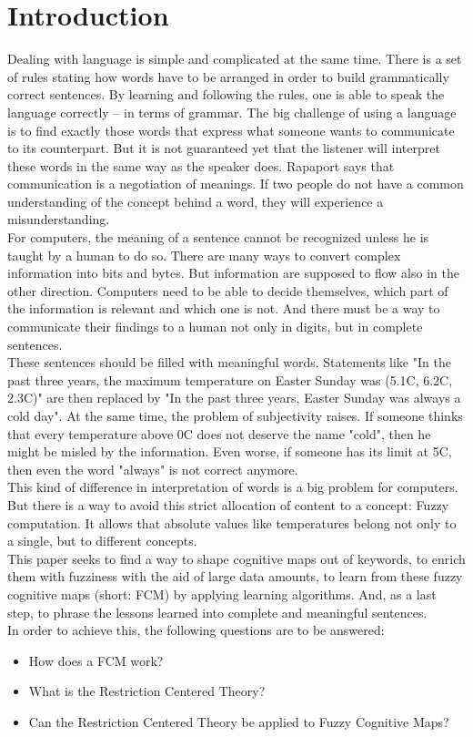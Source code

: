 \documentclass[conference]{IEEEtran}
\begin{document}
\section{Introduction}
Dealing with language is simple and complicated at the same time. There is a set of rules stating how words have to be arranged in order to build grammatically correct sentences. By learning and following the rules, one is able to speak the language correctly -- in terms of grammar. The big challenge of using a language is to find exactly those words that express what someone wants to communicate to its counterpart. But it is not guaranteed yet that the listener will interpret these words in the same way as the speaker does. Rapaport \cite{Rapaport2003} says that communication is a negotiation of meanings. If two people do not have a common understanding of the concept behind a word, they will experience a misunderstanding.\\
For computers, the meaning of a sentence cannot be recognized unless he is taught by a human to do so. There are many ways to convert complex information into bits and bytes. But information are supposed to flow also in the other direction. Computers need to be able to decide themselves, which part of the information is relevant and which one is not. And there must be a way to communicate their findings to a human not only in digits, but in complete sentences.\\
These sentences should be filled with meaningful words. Statements like "In the past three years, the maximum temperature on Easter Sunday was (5.1\degree C, 6.2\degree C, 2.3\degree C)" are then replaced by "In the past three years, Easter Sunday was always a cold day". At the same time, the problem of subjectivity raises. If someone thinks that every temperature above 0\degree C does not deserve the name "cold", then he might be misled by the information. Even worse, if someone has its limit at 5\degree C, then even the word "always" is not correct anymore.\\
This kind of difference in interpretation of words is a big problem for computers. But there is a way to avoid this strict allocation of content to a concept: Fuzzy computation. It allows that absolute values like temperatures belong not only to a single, but to different concepts.\\
This paper seeks to find a way to shape cognitive maps out of keywords, to enrich them with fuzziness with the aid of large data amounts, to learn from these fuzzy cognitive maps (short: FCM) by applying learning algorithms. And, as a last step, to phrase the lessons learned into complete and meaningful sentences.\\
In order to achieve this, the following questions are to be answered:
\begin{itemize}
\item How does a FCM work?
\item What is the Restriction Centered Theory?
\item Can the Restriction Centered Theory be applied to Fuzzy Cognitive Maps?
\end{itemize}
\end{document}
